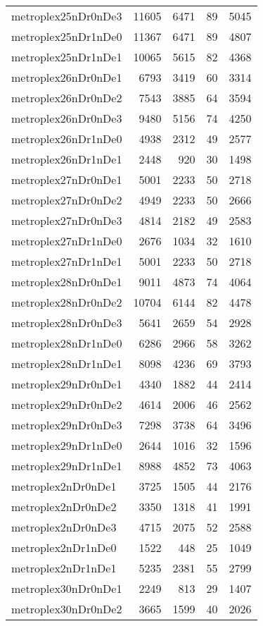 \begin{longtable}{lrrrr}
metroplex25nDr0nDe3 & 11605 & 6471 & 89 & 5045 \\
metroplex25nDr1nDe0 & 11367 & 6471 & 89 & 4807 \\
metroplex25nDr1nDe1 & 10065 & 5615 & 82 & 4368 \\
metroplex26nDr0nDe1 & 6793 & 3419 & 60 & 3314 \\
metroplex26nDr0nDe2 & 7543 & 3885 & 64 & 3594 \\
metroplex26nDr0nDe3 & 9480 & 5156 & 74 & 4250 \\
metroplex26nDr1nDe0 & 4938 & 2312 & 49 & 2577 \\
metroplex26nDr1nDe1 & 2448 & 920 & 30 & 1498 \\
metroplex27nDr0nDe1 & 5001 & 2233 & 50 & 2718 \\
metroplex27nDr0nDe2 & 4949 & 2233 & 50 & 2666 \\
metroplex27nDr0nDe3 & 4814 & 2182 & 49 & 2583 \\
metroplex27nDr1nDe0 & 2676 & 1034 & 32 & 1610 \\
metroplex27nDr1nDe1 & 5001 & 2233 & 50 & 2718 \\
metroplex28nDr0nDe1 & 9011 & 4873 & 74 & 4064 \\
metroplex28nDr0nDe2 & 10704 & 6144 & 82 & 4478 \\
metroplex28nDr0nDe3 & 5641 & 2659 & 54 & 2928 \\
metroplex28nDr1nDe0 & 6286 & 2966 & 58 & 3262 \\
metroplex28nDr1nDe1 & 8098 & 4236 & 69 & 3793 \\
metroplex29nDr0nDe1 & 4340 & 1882 & 44 & 2414 \\
metroplex29nDr0nDe2 & 4614 & 2006 & 46 & 2562 \\
metroplex29nDr0nDe3 & 7298 & 3738 & 64 & 3496 \\
metroplex29nDr1nDe0 & 2644 & 1016 & 32 & 1596 \\
metroplex29nDr1nDe1 & 8988 & 4852 & 73 & 4063 \\
metroplex2nDr0nDe1 & 3725 & 1505 & 44 & 2176 \\
metroplex2nDr0nDe2 & 3350 & 1318 & 41 & 1991 \\
metroplex2nDr0nDe3 & 4715 & 2075 & 52 & 2588 \\
metroplex2nDr1nDe0 & 1522 & 448 & 25 & 1049 \\
metroplex2nDr1nDe1 & 5235 & 2381 & 55 & 2799 \\
metroplex30nDr0nDe1 & 2249 & 813 & 29 & 1407 \\
metroplex30nDr0nDe2 & 3665 & 1599 & 40 & 2026 \\

\end{longtable}
